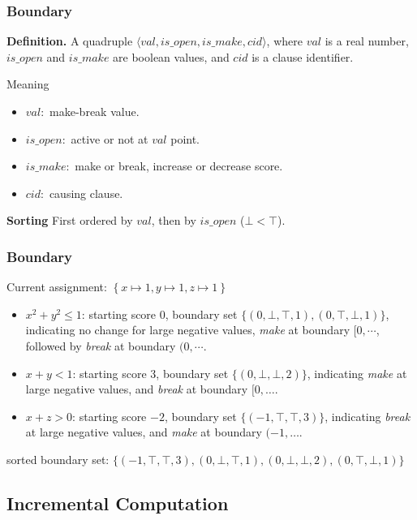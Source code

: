 \begin{frame} 
    \frametitle{Boundary}
    \textbf{Definition.} A quadruple $\langle \mathit{val}, \mathit{is\_open}, \mathit{is\_make}, \mathit{cid}\rangle$, where $\mathit{val}$ is a real number, $\mathit{is\_open}$ and $\mathit{is\_make}$ are boolean values, and $\mathit{cid}$ is a clause identifier.
    \vspace{0.4cm}
    \begin{alertblock}{Meaning}
        \begin{itemize}
            \item $val:$ make-break value.
            \item $is\_open:$ active or not at $val$ point.
            \item $is\_make:$ make or break, increase or decrease score.
            \item $cid:$ causing clause.
        \end{itemize}
    \end{alertblock}

    \textbf{Sorting} First ordered by $val$, then by $is\_open$ ($\bot<\top$).
\end{frame}

\begin{frame}
    \frametitle{Boundary}
    Current assignment: $\left\{ x\mapsto 1, y\mapsto 1, z\mapsto 1 \right\}$ \\
    \begin{itemize}
        \item $x^2+y^2\le 1$: starting score 0, boundary set $\{(0,\bot,\top,1), (0,\top,\bot,1)\}$, indicating no change for large negative values, \emph{make} at boundary $[0,\cdots$, followed by \emph{break} at boundary $(0,\cdots$.
        \item $x+y<1$: starting score 3, boundary set $\{(0,\bot,\bot,2)\}$, indicating \emph{make} at large negative values, and \emph{break} at boundary $[0,\dots$.
        \item $x+z>0$: starting score $-2$, boundary set $\{(-1,\top,\top,3)\}$, indicating \emph{break} at large negative values, and \emph{make} at boundary $(-1,\dots$.
    \end{itemize}
    sorted boundary set: $\{(-1,\top,\top,3),(0,\bot,\top,1),(0,\bot,\bot,2),(0,\top,\bot,1)\}$
\end{frame}

\subsection{Incremental Computation}

